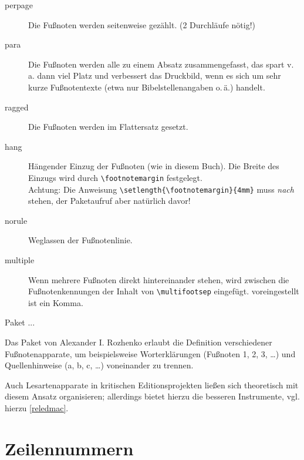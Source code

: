 \begin{description}
 \item[perpage] Die Fußnoten werden seitenweise gezählt. (2 Durchläufe nötig!)
 \item[para] Die Fußnoten werden alle zu einem Absatz zusammengefasst, das spart v.\,a. dann
  viel Platz und verbessert das Druckbild, wenn es sich um sehr kurze Fußnotentexte (etwa nur
  Bibelstellenangaben o.\,ä.) handelt.
 \item[ragged] Die Fußnoten werden im Flattersatz gesetzt.
 \item[hang] Hängender Einzug der Fußnoten (wie in diesem Buch).
  Die Breite des Einzugs wird durch \lstinline/\footnotemargin/ festgelegt.\\
  Achtung: Die Anweisung \lstinline/\setlength{\footnotemargin}{4mm}/ muss \emph{nach}
  \lstinline// stehen, der Paketaufruf aber natürlich davor!
 \item[norule] Weglassen der Fußnotenlinie.
 \item[multiple] Wenn mehrere Fußnoten direkt hintereinander stehen, wird zwischen die
  Fußnotenkennungen der Inhalt von \lstinline/\multifootsep/ eingefügt. voreingestellt ist
  ein Komma.
\end{description}




Paket ...




Das Paket  von Alexander I. Rozhenko
erlaubt die Definition verschiedener Fußnotenapparate, um beispielsweise
Worterklärungen (Fußnoten 1, 2, 3, \ldots ) und Quellenhinweise (a, b, c, \ldots ) voneinander zu trennen.

Auch Lesartenapparate in kritischen Editionsprojekten ließen sich theoretisch 
mit diesem Ansatz organisieren; 
allerdings bietet  hierzu die besseren Instrumente, vgl. hierzu \ref{reledmac}.


\section{Zeilennummern} 
\label{zeilennummer}

